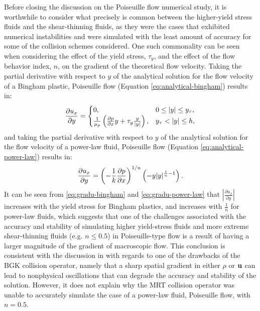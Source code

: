 Before closing the discussion on the Poiseuille flow numerical study, it is worthwhile to consider what precisely is common between the higher-yield stress fluids and the shear-thinning fluids, as they were the cases that exhibited numerical instabilities and were simulated with the least amount of accuracy for some of the collision schemes considered.
One such commonality can be seen when considering the effect of the yield stress, $\tau_y$, and the effect of the flow behavior index, $n$, on the gradient of the theoretical flow velocity.
Taking the partial derivative with respect to $y$ of the analytical solution for the flow velocity of a Bingham plastic, Poiseuille flow (Equation \eqref{eq:analytical-bingham}) results in:
\begin{equation} \label{eq:gradu-bingham}
  \frac{\partial u_x}{\partial y} = \begin{cases}
    0, & 0 \leq |y| \leq y_{\tau}, \\
    \frac{1}{\mu_p} \left( \frac{\partial p}{\partial x} y + \tau_y \frac{y}{|y|} \right), & y_{\tau} < |y| \leq h,
  \end{cases}
\end{equation}
and taking the partial derivative with respect to $y$ of the analytical solution for the flow velocity of a power-law fluid, Poiseuille flow (Equation \eqref{eq:analytical-power-law}) results in:
\begin{equation} \label{eq:gradu-power-law}
  \frac{\partial u_x}{\partial y} = \left( -\frac{1}{k} \frac{\partial p}{\partial x} \right)^{1/n} \left( -y |y|^{\frac{1}{n} - 1} \right).
\end{equation}
It can be seen from \eqref{eq:gradu-bingham} and \eqref{eq:gradu-power-law} that $\left| \frac{\partial u_x}{\partial y} \right|$ increases with the yield stress for Bingham plastics, and increases with $\frac{1}{n}$ for power-law fluids, which suggests that one of the challenges associated with the accuracy and stability of simulating higher yield-stress fluids and more extreme shear-thinning fluids (e.g. $n \le 0.5$) in Poiseuille-type flow is a result of having a larger magnitude of the gradient of macroscopic flow.
This conclusion is consistent with the discussion in  with regards to one of the drawbacks of the BGK collision operator, namely that a sharp spatial gradient in either $\rho$ or $\mathbf{u}$ can lead to nonphysical oscillations that can degrade the accuracy and stability of the solution.
However, it does not explain why the MRT collision operator was unable to accurately simulate the case of a power-law fluid, Poiseuille flow, with $n = 0.5$.

